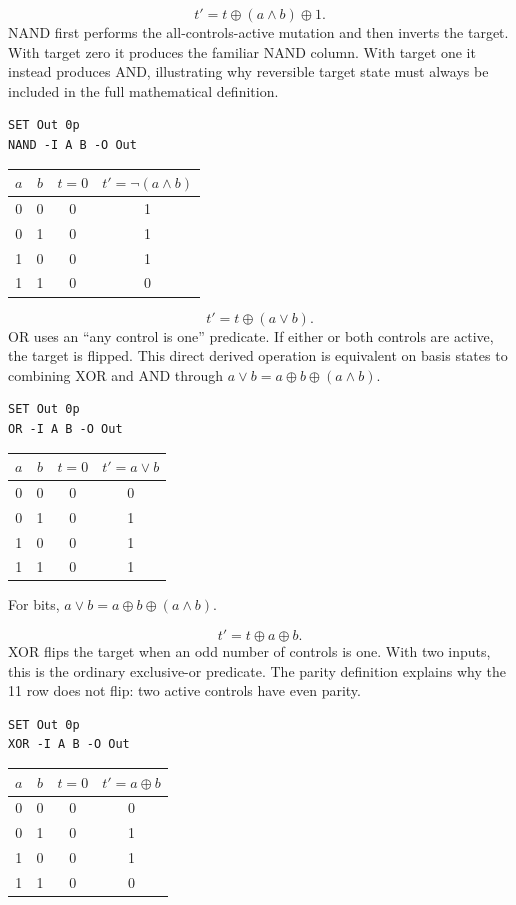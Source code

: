 
\[
t'=t\oplus(a\land b)\oplus1.
\]
NAND first performs the all-controls-active mutation and then inverts the
target. With target zero it produces the familiar NAND column. With target one
it instead produces AND, illustrating why reversible target state must always
be included in the full mathematical definition.
\begin{lstlisting}
SET Out 0p
NAND -I A B -O Out
\end{lstlisting}
\begin{center}
\begin{tabular}{cc|c|c}\toprule $a$&$b$&$t=0$&$t'=\neg(a\land b)$\\\midrule
0&0&0&1\\0&1&0&1\\1&0&0&1\\1&1&0&0\\\bottomrule
\end{tabular}
\end{center}


\[
t'=t\oplus(a\lor b).
\]
OR uses an ``any control is one'' predicate. If either or both controls are
active, the target is flipped. This direct derived operation is equivalent on
basis states to combining XOR and AND through
$a\lor b=a\oplus b\oplus(a\land b)$.
\begin{lstlisting}
SET Out 0p
OR -I A B -O Out
\end{lstlisting}
\begin{center}
\begin{tabular}{cc|c|c}\toprule $a$&$b$&$t=0$&$t'=a\lor b$\\\midrule
0&0&0&0\\0&1&0&1\\1&0&0&1\\1&1&0&1\\\bottomrule
\end{tabular}
\end{center}
For bits, $a\lor b=a\oplus b\oplus(a\land b)$.


\[
t'=t\oplus a\oplus b.
\]
XOR flips the target when an odd number of controls is one. With two inputs,
this is the ordinary exclusive-or predicate. The parity definition explains
why the 11 row does not flip: two active controls have even parity.
\begin{lstlisting}
SET Out 0p
XOR -I A B -O Out
\end{lstlisting}
\begin{center}
\begin{tabular}{cc|c|c}\toprule $a$&$b$&$t=0$&$t'=a\oplus b$\\\midrule
0&0&0&0\\0&1&0&1\\1&0&0&1\\1&1&0&0\\\bottomrule
\end{tabular}
\end{center}


